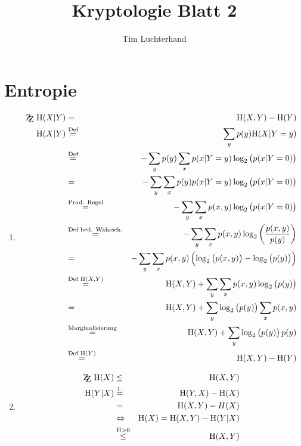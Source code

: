 \documentclass[DIN, pagenumber=false, fontsize=11pt, parskip=half]{scrartcl}
\title{Kryptologie Blatt 2}
\author{Tim Luchterhand}
\newcommand{\ZZ}{\mathrm{Z\kern-.3em\raise-0.5ex\hbox{Z}}}
\newcommand{\Ent}{\text{H}}
\begin{document}
    \maketitle
    \setcounter{section}{1}
    \section{Entropie}
    \begin{enumerate}
        \item 
            \begin{eqnarray*}
                \ZZ \ \Ent(X | Y) &=& \Ent(X, Y) - \Ent(Y) \\
                \Ent(X | Y) &\stackrel{\text{Def}}{=}& \sum_y{p(y) \Ent(X | Y = y)} \\
                &\stackrel{\text{Def}}{=}& - \sum_y{p(y) \sum_x{p(x | Y = y) \log_2\left(p(x | Y = 0)\right)}} \\
                &=& - \sum_y{\sum_x{p(y) p(x | Y = y) \log_2\left(p(x | Y = 0)\right)}} \\
                &\stackrel{\text{Prod. Regel}}{=}& - \sum_y{\sum_x{p(x, y) \log_2\left(p(x | Y = 0)\right)}} \\
                &\stackrel{\text{Def bed. Wahrsch.}}{=}& - \sum_y{\sum_x{p(x, y) \log_2\left(\frac{p(x,y)}{p(y)}\right)}} \\
                &=& - \sum_y{\sum_x{p(x, y) \left(\log_2\left(p(x, y)\right) - \log_2\left(p(y)\right)\right)}} \\
                &\stackrel{\text{Def } \Ent(X, Y)}{=}& \Ent(X, Y) + \sum_y{\sum_x{p(x, y) \log_2\left(p(y)\right)}} \\
                &=& \Ent(X, Y) + \sum_y{\log_2\left(p(y)\right) \sum_x{p(x, y) }} \\
                &\stackrel{\text{Marginalisierung}}{=}& \Ent(X, Y) + \sum_y{\log_2\left(p(y)\right) p(y)} \\
                &\stackrel{\text{Def } \Ent(Y)}{=}& \Ent(X, Y) - \Ent(Y)
            \end{eqnarray*}
        \item
            \begin{eqnarray*}
                \ZZ \ \Ent(X) &\leq& \Ent(X, Y) \\
                \Ent(Y | X) &\stackrel{1.}{=}& \Ent(Y, X) - \Ent(X) \\
                &=& \Ent(X, Y) - H(X) \\
                &\Leftrightarrow& \Ent(X) = \Ent(X, Y) - \Ent(Y | X) \\
                &\stackrel{\Ent > 0}{\leq}& \Ent(X, Y)
            \end{eqnarray*}
    \end{enumerate}
\end{document}
